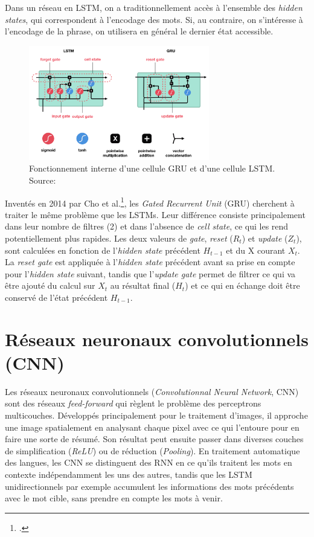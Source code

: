 Dans un réseau en LSTM, on a traditionnellement accès à l'ensemble des \textit{hidden states}, qui correspondent à l'encodage des mots. Si, au contraire, on s'intéresse à l'encodage de la phrase, on utilisera en général le dernier état accessible.

\begin{figure}[h]
    \centering
    \includegraphics[height=5cm]{figures/chap2/GRU LSTM.png}
    \caption{Fonctionnement interne d'une cellule GRU et d'une cellule LSTM. Source: \cite{nguyen_illustrated_2019}}
    \label{fig:deep-learning:lstm-gru}
\end{figure}


\label{deep-learning:gru}
Inventés en 2014 par Cho et al.\footcite{cho_properties_2014}, les \textit{Gated Recurrent Unit} (GRU) cherchent à traiter le même problème que les LSTMs. Leur différence consiste principalement dans leur nombre de filtres (2) et dans l'absence de \textit{cell state}, ce qui les rend potentiellement plus rapides. Les deux valeurs de \textit{gate}, \textit{reset} ($R_{t}$) et \textit{update} ($Z_{t}$), sont calculées en fonction de l'\textit{hidden state} précédent $H_{t-1}$ et du X courant $X_{t}$. La \textit{reset gate} est appliquée à l'\textit{hidden state} précédent avant sa prise en compte pour l'\textit{hidden state} suivant, tandis que l'\textit{update gate} permet de filtrer ce qui va être ajouté du calcul sur $X_{t}$ au résultat final ($H_{t}$) et ce qui en échange doit être conservé de l'état précédent $H_{t-1}$.


\section{Réseaux neuronaux convolutionnels (CNN)}
\label{deep-learning:CNN}

Les réseaux neuronaux convolutionnels (\textit{Convolutionnal Neural Network}, CNN) sont des réseaux \textit{feed-forward} qui règlent le problème des perceptrons multicouches. Développés principalement pour le traitement d'images, il approche une image spatialement en analysant chaque pixel avec ce qui l'entoure pour en faire une sorte de résumé. Son résultat peut ensuite passer dans diverses couches de simplification (\textit{ReLU}) ou de réduction (\textit{Pooling}). En traitement automatique des langues, les CNN se distinguent des RNN en ce qu'ils traitent les mots en contexte indépendamment les uns des autres, tandis que les LSTM unidirectionnels par exemple accumulent les informations des mots précédents avec le mot cible, sans prendre en compte les mots à venir.

